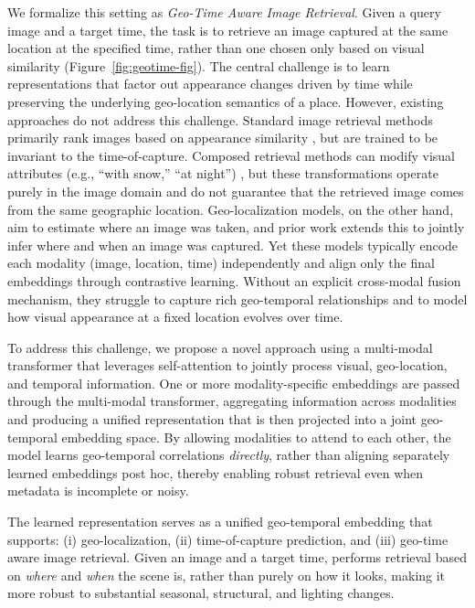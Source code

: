 We formalize this setting as \emph{Geo-Time Aware Image Retrieval}. Given a query image and a target time, the task is to retrieve an image captured at the same location at the specified time, rather than one chosen only based on visual similarity (Figure~\ref{fig:geotime-fig}). The central challenge is to learn representations that factor out appearance changes driven by time while preserving the underlying geo-location semantics of a place. 
However, existing approaches do not address this challenge. Standard image retrieval methods primarily rank images based on appearance similarity \cite{zhu2023r2former, keetha2023anyloc, Berton_2025_CVPR}, but are trained to be invariant to the time-of-capture. Composed retrieval methods can modify visual attributes (e.g., “with snow,” “at night”) \cite{saito2023pic2word, baldrati2023zero}, but these transformations operate purely in the image domain and do not guarantee that the retrieved image comes from the same geographic location. Geo-localization models, on the other hand, aim to estimate where an image was taken, and prior work \cite{zhai2019learning, Shatwell_2025_ICCV} extends this to jointly infer where and when an image was captured. Yet these models typically encode each modality (image, location, time) independently and align only the final embeddings through contrastive learning. Without an explicit cross-modal fusion mechanism, they struggle to capture rich geo-temporal relationships and to model how visual appearance at a fixed location evolves over time.

To address this challenge, we propose a novel approach using a multi-modal transformer that leverages self-attention to jointly process visual, geo-location, and temporal information. One or more modality-specific embeddings are passed through the multi-modal transformer, aggregating information across modalities and producing a unified representation that is then projected into a joint geo-temporal embedding space. By allowing modalities to attend to each other, the model learns geo-temporal correlations \emph{directly}, rather than aligning separately learned embeddings post hoc, thereby enabling robust retrieval even when metadata is incomplete or noisy.

The learned representation serves as a unified geo-temporal embedding that supports: (i) geo-localization, (ii) time-of-capture prediction, and (iii) geo-time aware image retrieval. Given an image and a target time, \tiger performs retrieval based on \emph{where} and \emph{when} the scene is, rather than purely on how it looks, making it more robust to substantial seasonal, structural, and lighting changes.

